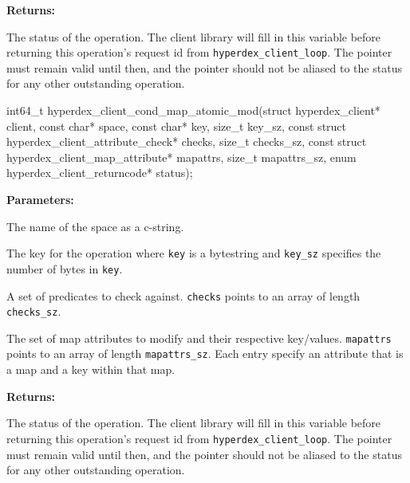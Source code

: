 \noindent\textbf{Returns:}
\begin{description}[labelindent=\widthof{{\texttt{status}}},leftmargin=*,noitemsep,nolistsep,align=right]
\item[\texttt{status}] The status of the operation.  The client library will fill in this variable before returning this operation's request id from \texttt{hyperdex\_client\_loop}.  The pointer must remain valid until then, and the pointer should not be aliased to the status for any other outstanding operation.
\end{description}

\funcsep
\begin{ccode}
int64_t hyperdex_client_cond_map_atomic_mod(struct hyperdex_client* client,
                const char* space,
                const char* key, size_t key_sz,
                const struct hyperdex_client_attribute_check* checks, size_t checks_sz,
                const struct hyperdex_client_map_attribute* mapattrs, size_t mapattrs_sz,
                enum hyperdex_client_returncode* status);
\end{ccode}
\funcdesc 

\noindent\textbf{Parameters:}
\begin{description}[labelindent=\widthof{{\texttt{mapattrs}, \texttt{mapattrs\_sz}}},leftmargin=*,noitemsep,nolistsep,align=right]
\item[\texttt{space}] The name of the space as a c-string.
\item[\texttt{key}, \texttt{key\_sz}] The key for the operation where \texttt{key} is a bytestring and \texttt{key\_sz} specifies the number of bytes in \texttt{key}.
\item[\texttt{checks}, \texttt{checks\_sz}] A set of predicates to check against.  \texttt{checks} points to an array of length \texttt{checks\_sz}.
\item[\texttt{mapattrs}, \texttt{mapattrs\_sz}] The set of map attributes to modify and their respective key/values.  \texttt{mapattrs} points to an array of length \texttt{mapattrs\_sz}.  Each entry specify an attribute that is a map and a key within that map.
\end{description}

\noindent\textbf{Returns:}
\begin{description}[labelindent=\widthof{{\texttt{status}}},leftmargin=*,noitemsep,nolistsep,align=right]
\item[\texttt{status}] The status of the operation.  The client library will fill in this variable before returning this operation's request id from \texttt{hyperdex\_client\_loop}.  The pointer must remain valid until then, and the pointer should not be aliased to the status for any other outstanding operation.
\end{description}

